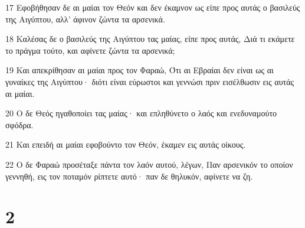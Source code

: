 \par 17 Εφοβήθησαν δε αι μαίαι τον Θεόν και δεν έκαμνον ως είπε προς αυτάς ο βασιλεύς της Αιγύπτου, αλλ' άφινον ζώντα τα αρσενικά.
\par 18 Καλέσας δε ο βασιλεύς της Αιγύπτου τας μαίας, είπε προς αυτάς, Διά τι εκάμετε το πράγμα τούτο, και αφίνετε ζώντα τα αρσενικά;
\par 19 Και απεκρίθησαν αι μαίαι προς τον Φαραώ, Ότι αι Εβραίαι δεν είναι ως αι γυναίκες της Αιγύπτου· διότι είναι εύρωστοι και γεννώσι πριν εισέλθωσιν εις αυτάς αι μαίαι.
\par 20 Ο δε Θεός ηγαθοποίει τας μαίας· και επληθύνετο ο λαός και ενεδυναμούτο σφόδρα.
\par 21 Και επειδή αι μαίαι εφοβούντο τον Θεόν, έκαμεν εις αυτάς οίκους.
\par 22 Ο δε Φαραώ προσέταξε πάντα τον λαόν αυτού, λέγων, Παν αρσενικόν το οποίον γεννηθή, εις τον ποταμόν ρίπτετε αυτό· παν δε θηλυκόν, αφίνετε να ζη.

\chapter{2}

